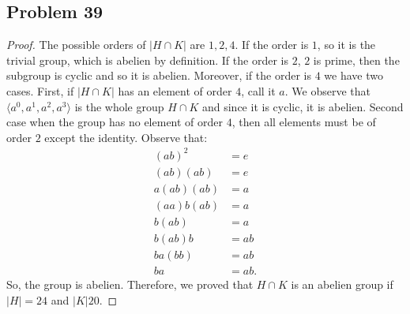 \documentclass[a4paper,12pt]{article}
\begin{document}
\subsection*{Problem 39}
\begin{proof}
    
The possible orders of $|H \cap K|$ are $1,2,4$. If the order is $1$, so it is the trivial group, which is abelien by definition. If the order is $2$, $2$ is prime, then the subgroup is cyclic and so it is abelien. Moreover, if the order is $4$ we have two cases. First, if $|H \cap K|$ has an element of order $4$, call it $a.$ We observe that $\langle a^0, a^1, a^2,a^3 \rangle$ is the whole group $H \cap K$ and since it is cyclic, it is abelien. Second case when the group has no element of order $4$, then all elements must be of order $2$ except the identity. Observe that:
\begin{align*}
    (ab)^2&=e\\
    (ab)(ab)&=e\\
    a(ab)(ab)&=a\\
    (aa)b(ab)&=a\\
    b(ab)&=a\\
    b(ab)b&=ab\\
    ba(bb)&=ab\\
    ba&=ab.
\end{align*}
So, the group is abelien. Therefore, we proved that $H \cap K$ is an abelien group if $|H|=24$ and $|K|20.$
\end{proof}
\end{document}
